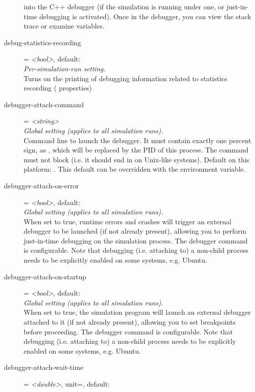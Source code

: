 \begin{description}
    into the C++ debugger (if the simulation is running under one, or
    just-in-time debugging is activated). Once in the debugger, you can view
    the stack trace or examine variables.
\item[debug-statistics-recording] = \textit{<bool>}, default: \\
    \textit{Per-simulation-run setting.}\\
    Turns on the printing of debugging information related to statistics
    recording ( properties)
\item[debugger-attach-command] = \textit{<string>}\\
    \textit{Global setting (applies to all simulation runs).}\\
    Command line to launch the debugger. It must contain exactly one percent
    sign, as , which will be replaced by the PID of this process. The
    command must not block (i.e. it should end in \ttt{\&} on Unix-like
    systems). Default on this platform: . This default can be overridden with the
     environment variable.
\item[debugger-attach-on-error] = \textit{<bool>}, default: \\
    \textit{Global setting (applies to all simulation runs).}\\
    When set to true, runtime errors and crashes will trigger an external
    debugger to be launched (if not already present), allowing you to perform
    just-in-time debugging on the simulation process. The debugger command is
    configurable. Note that debugging (i.e. attaching to) a non-child process
    needs to be explicitly enabled on some systems, e.g. Ubuntu.
\item[debugger-attach-on-startup] = \textit{<bool>}, default: \\
    \textit{Global setting (applies to all simulation runs).}\\
    When set to true, the simulation program will launch an external debugger
    attached to it (if not already present), allowing you to set breakpoints
    before proceeding. The debugger command is configurable. Note that
    debugging (i.e. attaching to) a non-child process needs to be explicitly
    enabled on some systems, e.g. Ubuntu.
\item[debugger-attach-wait-time] = \textit{<double>}, unit=, default: \\

\end{description}
